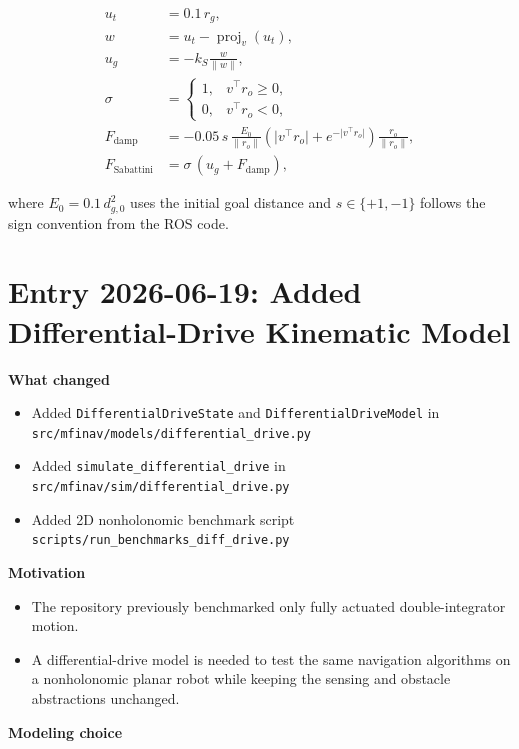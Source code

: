 \documentclass[11pt]{article}
\begin{document}
\begin{align}
u_t &= 0.1\,r_g, \\
w &= u_t - \operatorname{proj}_{v}(u_t), \\
u_g &= -k_S \frac{w}{\lVert w \rVert}, \\
\sigma &=
\begin{cases}
1, & v^\top r_o \ge 0, \\
0, & v^\top r_o < 0,
\end{cases} \\
F_{\text{damp}} &= -0.05\,s\,\frac{E_0}{\lVert r_o \rVert}
\left(\lvert v^\top r_o \rvert + e^{-\lvert v^\top r_o \rvert}\right)
\frac{r_o}{\lVert r_o \rVert}, \\
F_{\text{Sabattini}} &= \sigma\,(u_g + F_{\text{damp}}),
\end{align}

where \(E_0 = 0.1\,d_{g,0}^2\) uses the initial goal distance and \(s \in \{+1,-1\}\) follows the sign convention from the ROS code.

\section*{Entry 2026-06-19: Added Differential-Drive Kinematic Model}

\textbf{What changed}

\begin{itemize}[leftmargin=*]
  \item Added \texttt{DifferentialDriveState} and \texttt{DifferentialDriveModel} in \texttt{src/mfinav/models/differential\_drive.py}
  \item Added \texttt{simulate\_differential\_drive} in \texttt{src/mfinav/sim/differential\_drive.py}
  \item Added 2D nonholonomic benchmark script \texttt{scripts/run\_benchmarks\_diff\_drive.py}
\end{itemize}

\textbf{Motivation}

\begin{itemize}[leftmargin=*]
  \item The repository previously benchmarked only fully actuated double-integrator motion.
  \item A differential-drive model is needed to test the same navigation algorithms on a nonholonomic planar robot while keeping the sensing and obstacle abstractions unchanged.
\end{itemize}

\textbf{Modeling choice}
\end{document}
